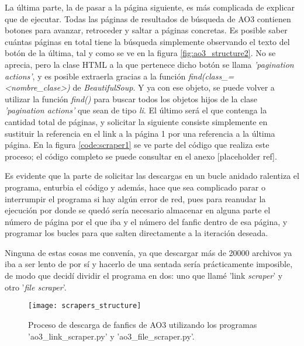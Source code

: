 \documentclass{pre-tfg}
\newcommand{\refToLinkScraperCode}{[placeholder ref]}
\begin{document}
La última parte, la de pasar a la página siguiente, es más complicada de explicar que de ejecutar. Todas las páginas de resultados de búsqueda de AO3 contienen botones para avanzar, retroceder y saltar a páginas concretas. Es posible saber cuántas páginas en total tiene la búsqueda simplemente observando el texto del botón de la última, tal y como se ve en la figura \ref{fig:ao3_structure2}. No se aprecia, pero la clase HTML a la que pertenece dicho botón se llama \textit{'pagination actions'}, y es posible extraerla gracias a la función \textit{find(class\_=<nombre\_clase>)} de \textit{BeautifulSoup}. Y ya con ese objeto, se puede volver a utilizar la función \textit{find()} para buscar todos los objetos hijos de la clase \textit{'pagination actions'} que sean de tipo \textit{li}. El último será el que contenga la cantidad total de páginas, y solicitar la siguiente consiste simplemente en sustituir la referencia en el link a la página 1 por una referencia a la última página. En la figura \ref{code:scraper1} se ve parte del código que realiza este proceso; el código completo se puede consultar en el anexo \refToLinkScraperCode.

Es evidente que la parte de solicitar las descargas en un bucle anidado ralentiza el programa, enturbia el código y además, hace que sea complicado parar o interrumpir el programa si hay algún error de red, pues para reanudar la ejecución por donde se quedó sería necesario almacenar en alguna parte el número de página por el que iba y el número del fanfic dentro de esa página, y programar los bucles para que salten directamente a la iteración deseada.

Ninguna de estas cosas me convenía, ya que descargar más de 20000 archivos ya iba a ser lento de por sí y hacerlo de una sentada sería prácticamente imposible, de modo que decidí dividir el programa en dos: uno que llamé 'link \textit{scraper}' y otro '\textit{file scraper}'.

\begin{figure}[h]
	\texttt{[image: scrapers\_structure]}
	\caption{Proceso de descarga de fanfics de AO3 utilizando los programas 'ao3\_link\_scraper.py' y 'ao3\_file\_scraper.py'.}
	\label{fig:scrapers_structure}
	\centering
\end{figure}
\end{document}
